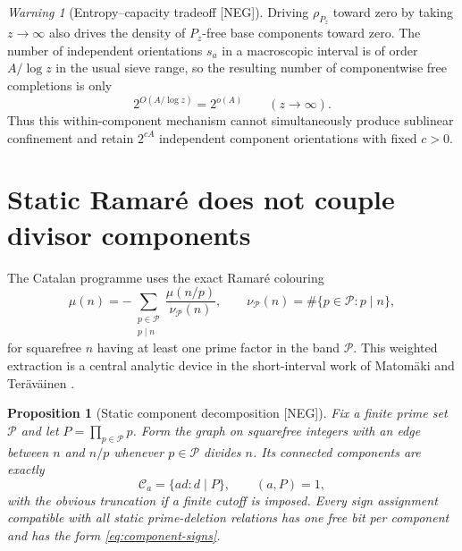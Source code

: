 \documentclass[11pt]{amsart}
\numberwithin{equation}{section}
\theoremstyle{plain}
\newtheorem{proposition}[theorem]{Proposition}
\theoremstyle{definition}
\theoremstyle{remark}
\newtheorem{warning}[theorem]{Warning}
\newcommand{\Mob}{\mu}
\newcommand{\NEG}{\textup{[NEG]}}
\begin{document}
\begin{warning}[Entropy--capacity tradeoff \NEG]
\label{warn:entropy-capacity}
Driving $\rho_{P_z}$ toward zero by taking $z\to\infty$ also drives the density of $P_z$-free base components toward
zero.  The number of independent orientations $s_a$ in a macroscopic interval is of order $A/\log z$ in the usual
sieve range, so the resulting number of componentwise free completions is only
\begin{equation}
2^{O(A/\log z)}=2^{o(A)}
\qquad(z\to\infty).
\label{eq:entropy-loss}
\end{equation}
Thus this within-component mechanism cannot simultaneously produce sublinear confinement and retain
$2^{cA}$ independent component orientations with fixed $c>0$.
\end{warning}

\section{Static Ramar\'e does not couple divisor components}
\label{sec:static-ramare-no-go}

The Catalan programme uses the exact Ramar\'e colouring
\begin{equation}
\Mob(n)
=
-\sum_{\substack{p\in\mathcal P\\p\mid n}}
\frac{\Mob(n/p)}{\nu_{\mathcal P}(n)},
\qquad
\nu_{\mathcal P}(n)=\#\{p\in\mathcal P:p\mid n\},
\label{eq:ramare-colouring}
\end{equation}
for squarefree $n$ having at least one prime factor in the band $\mathcal P$.  This weighted extraction is a central
analytic device in the short-interval work of Matom\"aki and Ter\"av\"ainen \cite{MatomakiTeravainen2023}.

\begin{proposition}[Static component decomposition \NEG]
\label{prop:static-ramare-components}
Fix a finite prime set $\mathcal P$ and let $P=\prod_{p\in\mathcal P}p$.  Form the graph on squarefree integers with an
edge between $n$ and $n/p$ whenever $p\in\mathcal P$ divides $n$.  Its connected components are exactly
\begin{equation}
\mathcal C_a=\{ad:d\mid P\},
\qquad (a,P)=1,
\label{eq:ramare-components}
\end{equation}
with the obvious truncation if a finite cutoff is imposed.  Every sign assignment compatible with all static prime-deletion
relations has one free bit per component and has the form \eqref{eq:component-signs}.
\end{proposition}
\end{document}

